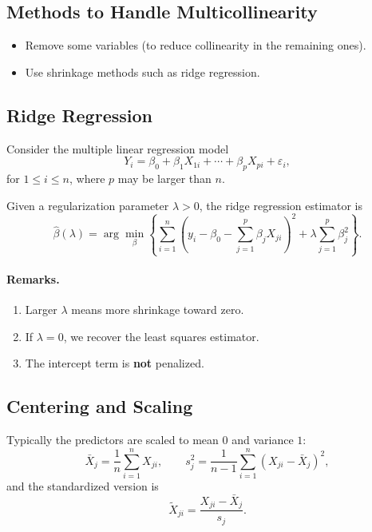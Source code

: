\subsection{Methods to Handle Multicollinearity}

\begin{itemize}
    \item Remove some variables (to reduce collinearity in the remaining ones).
    \item Use shrinkage methods such as ridge regression.
\end{itemize}

\subsection{Ridge Regression}

Consider the multiple linear regression model
\[
    Y_i = \beta_0 + \beta_1 X_{1i} + \cdots + \beta_p X_{pi} + \varepsilon_i,
\]
for $1 \leq i \leq n$, where $p$ may be larger than $n$.

Given a regularization parameter $\lambda > 0$, the ridge regression estimator is
\[
    \hat{\beta}(\lambda)
    = \arg\min_{\beta}
    \left\{
        \sum_{i=1}^n \left( y_i - \beta_0 - \sum_{j=1}^p \beta_j X_{ji} \right)^2
        +
        \lambda \sum_{j=1}^p \beta_j^2
    \right\}.
\]

\paragraph{Remarks.}
\begin{enumerate}
    \item Larger $\lambda$ means more shrinkage toward zero.
    \item If $\lambda = 0$, we recover the least squares estimator.
    \item The intercept term is \textbf{not} penalized.
\end{enumerate}

\subsection{Centering and Scaling}

Typically the predictors are scaled to mean $0$ and variance $1$:
\[
    \bar{X}_j = \frac{1}{n} \sum_{i=1}^n X_{ji},
    \qquad
    s_j^2 = \frac{1}{n-1} \sum_{i=1}^n (X_{ji} - \bar{X}_j)^2,
\]
and the standardized version is
\[
    \tilde{X}_{ji} = \frac{X_{ji} - \bar{X}_j}{s_j}.
\]

